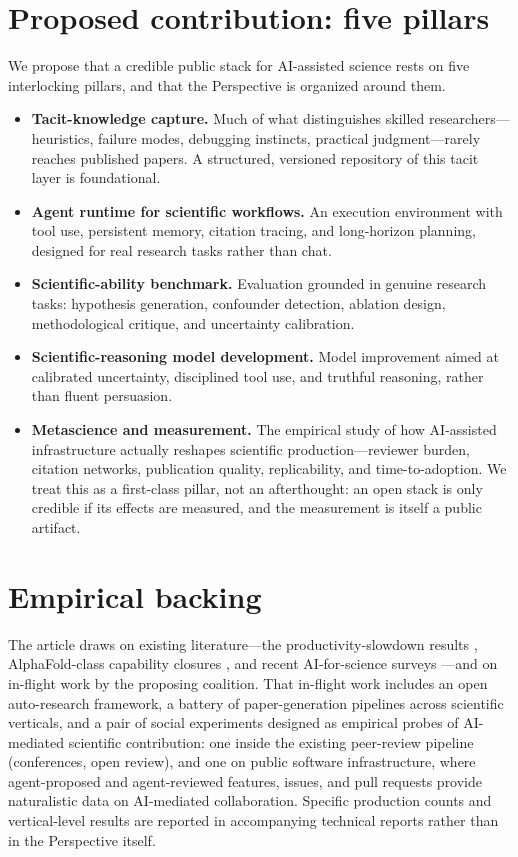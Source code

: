 \documentclass[11pt]{article}
\begin{document}
\section{Proposed contribution: five pillars}
We propose that a credible public stack for AI-assisted science rests on five interlocking pillars, and that the Perspective is organized around them.

\begin{itemize}
    \item \textbf{Tacit-knowledge capture.} Much of what distinguishes skilled researchers---heuristics, failure modes, debugging instincts, practical judgment---rarely reaches published papers. A structured, versioned repository of this tacit layer is foundational.
    \item \textbf{Agent runtime for scientific workflows.} An execution environment with tool use, persistent memory, citation tracing, and long-horizon planning, designed for real research tasks rather than chat.
    \item \textbf{Scientific-ability benchmark.} Evaluation grounded in genuine research tasks: hypothesis generation, confounder detection, ablation design, methodological critique, and uncertainty calibration.
    \item \textbf{Scientific-reasoning model development.} Model improvement aimed at calibrated uncertainty, disciplined tool use, and truthful reasoning, rather than fluent persuasion.
    \item \textbf{Metascience and measurement.} The empirical study of how AI-assisted infrastructure actually reshapes scientific production---reviewer burden, citation networks, publication quality, replicability, and time-to-adoption. We treat this as a first-class pillar, not an afterthought: an open stack is only credible if its effects are measured, and the measurement is itself a public artifact.
\end{itemize}

\section{Empirical backing}
The article draws on existing literature---the productivity-slowdown results \citep{bloom2020ideas}, AlphaFold-class capability closures \citep{jumper2021alphafold}, and recent AI-for-science surveys \citep{wang2023discovery}---and on in-flight work by the proposing coalition. That in-flight work includes an open auto-research framework, a battery of paper-generation pipelines across scientific verticals, and a pair of social experiments designed as empirical probes of AI-mediated scientific contribution: one inside the existing peer-review pipeline (conferences, open review), and one on public software infrastructure, where agent-proposed and agent-reviewed features, issues, and pull requests provide naturalistic data on AI-mediated collaboration. Specific production counts and vertical-level results are reported in accompanying technical reports rather than in the Perspective itself.
\end{document}
